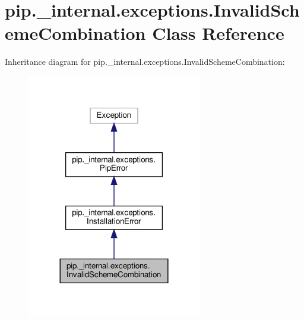\hypertarget{classpip_1_1__internal_1_1exceptions_1_1InvalidSchemeCombination}{}\section{pip.\+\_\+internal.\+exceptions.\+Invalid\+Scheme\+Combination Class Reference}
\label{classpip_1_1__internal_1_1exceptions_1_1InvalidSchemeCombination}


Inheritance diagram for pip.\+\_\+internal.\+exceptions.\+Invalid\+Scheme\+Combination\+:
\nopagebreak
\begin{figure}[H]
\begin{center}
\leavevmode
\includegraphics[width=216pt]{classpip_1_1__internal_1_1exceptions_1_1InvalidSchemeCombination__inherit__graph}
\end{center}
\end{figure}


